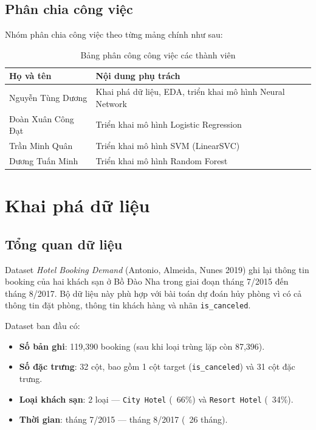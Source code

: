 \documentclass[12pt, a4paper]{article}
\begin{document}
\subsection{Phân chia công việc}

Nhóm phân chia công việc theo từng mảng chính như sau:

\begin{table}[h!]
\centering
\caption{Bảng phân công công việc các thành viên}
\renewcommand{\arraystretch}{1.3}
\begin{tabular}{|l|p{8cm}|}
\hline
\textbf{Họ và tên} & \textbf{Nội dung phụ trách} \\ \hline
Nguyễn Tùng Dương & Khai phá dữ liệu, EDA, triển khai mô hình Neural Network \\ \hline
Đoàn Xuân Công Đạt & Triển khai mô hình Logistic Regression \\ \hline
Trần Minh Quân & Triển khai mô hình SVM (LinearSVC) \\ \hline
Dương Tuấn Minh & Triển khai mô hình Random Forest \\ \hline

\end{tabular}
\end{table}

\newpage
\section{Khai phá dữ liệu}

\subsection{Tổng quan dữ liệu}

Dataset \emph{Hotel Booking Demand} (Antonio, Almeida, Nunes 2019) ghi lại thông tin booking của hai khách sạn ở Bồ Đào Nha trong giai đoạn tháng 7/2015 đến tháng 8/2017. Bộ dữ liệu này phù hợp với bài toán dự đoán hủy phòng vì có cả thông tin đặt phòng, thông tin khách hàng và nhãn \texttt{is\_canceled}.

Dataset ban đầu có:

\begin{itemize}
    \item \textbf{Số bản ghi}: 119{,}390 booking (sau khi loại trùng lặp còn 87{,}396).
    \item \textbf{Số đặc trưng}: 32 cột, bao gồm 1 cột target (\texttt{is\_canceled}) và 31 cột đặc trưng.
    \item \textbf{Loại khách sạn}: 2 loại --- \texttt{City Hotel} (~66\%) và \texttt{Resort Hotel} (~34\%).
    \item \textbf{Thời gian}: tháng 7/2015 --- tháng 8/2017 (~26 tháng).
\end{itemize}
\end{document}
